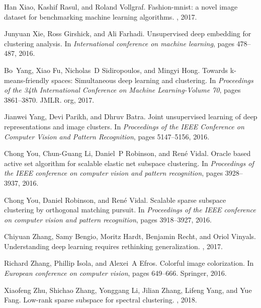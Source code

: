 \documentclass{article}
\begin{document}
\begin{thebibliography}{10}
Han Xiao, Kashif Rasul, and Roland Vollgraf.
\newblock Fashion-mnist: a novel image dataset for benchmarking machine
  learning algorithms.
, 2017.

Junyuan Xie, Ross Girshick, and Ali Farhadi.
\newblock Unsupervised deep embedding for clustering analysis.
\newblock In {\em International conference on machine learning}, pages
  478--487, 2016.

Bo~Yang, Xiao Fu, Nicholas~D Sidiropoulos, and Mingyi Hong.
\newblock Towards k-means-friendly spaces: Simultaneous deep learning and
  clustering.
\newblock In {\em Proceedings of the 34th International Conference on Machine
  Learning-Volume 70}, pages 3861--3870. JMLR. org, 2017.

Jianwei Yang, Devi Parikh, and Dhruv Batra.
\newblock Joint unsupervised learning of deep representations and image
  clusters.
\newblock In {\em Proceedings of the IEEE Conference on Computer Vision and
  Pattern Recognition}, pages 5147--5156, 2016.

Chong You, Chun-Guang Li, Daniel~P Robinson, and Ren{\'e} Vidal.
\newblock Oracle based active set algorithm for scalable elastic net subspace
  clustering.
\newblock In {\em Proceedings of the IEEE conference on computer vision and
  pattern recognition}, pages 3928--3937, 2016.

Chong You, Daniel Robinson, and Ren{\'e} Vidal.
\newblock Scalable sparse subspace clustering by orthogonal matching pursuit.
\newblock In {\em Proceedings of the IEEE conference on computer vision and
  pattern recognition}, pages 3918--3927, 2016.

Chiyuan Zhang, Samy Bengio, Moritz Hardt, Benjamin Recht, and Oriol Vinyals.
\newblock Understanding deep learning requires rethinking generalization.
,
  2017.

Richard Zhang, Phillip Isola, and Alexei~A Efros.
\newblock Colorful image colorization.
\newblock In {\em European conference on computer vision}, pages 649--666.
  Springer, 2016.

Xiaofeng Zhu, Shichao Zhang, Yonggang Li, Jilian Zhang, Lifeng Yang, and Yue
  Fang.
\newblock Low-rank sparse subspace for spectral clustering.
, 2018.

\end{thebibliography}
 
\end{document}
